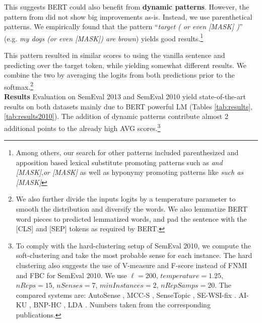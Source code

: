 \documentclass[11pt,a4paper]{article}
\begin{document}
This suggests BERT could also benefit from \textbf{dynamic patterns}. However,
the pattern from \citet{amrami2018word} did not show big improvements as-is. 
Instead, we use parenthetical
patterns. 
We empirically found that the pattern ``\emph{target ( or even [MASK] )}'' (e.g.
\emph{my dogs (or even [MASK]) are brown}) yields
good results.\footnote{Among others, our search for other patterns included parenthesized and apposition based lexical substitute promoting patterns such as \emph{and [MASK]},\emph{or [MASK]} as well as hyponymy promoting patterns like \emph{such as [MASK]}} 

This pattern resulted in similar scores to using the
vanilla sentence and predicting over the target token, while yielding somewhat
different results. We combine the two by averaging the logits from both
predictions prior to the softmax.\footnote{We also further divide the inputs
logits by a temperature parameter to smooth the distribution and diversify the
words. We also lemmatize BERT word pieces to predicted lemmatized words, and pad
the sentence with the [CLS] and [SEP] tokens as required by BERT.}
\\
\noindent\textbf{Results }
Evaluation on SemEval 2013 and SemEval 2010 yield 
state-of-the-art results on both datasets mainly due to BERT powerful LM (Tables \ref{tab:results},\ref{tab:results2010}). The addition of dynamic patterns contribute almost 2 additional points to the already
high AVG scores.\footnote{To comply with the hard-clustering setup of SemEval
2010, we compute the soft-clustering and take the most probable sense for each
instance. The hard clustering also suggests the use of V-measure and F-score
instead of FNMI and FBC for SemEval 2010. We use $\ell=200$, $temperature=1.25$,
$nReps=15$, $nSenses=7$, $minInstances=2$, $nRepSamps=20$. The compared systems
are: AutoSense \cite{hwang2019autosense}, 
MCC-S \cite{komninos2016structured}, 
SenseTopic \cite{wang2015sense}, 
SE-WSI-fix \cite{song2016word}.
AI-KU \cite{baskaya2013ai}
, BNP-HC \cite{teh2005sharing}
, LDA \cite{blei2003latent}. Numbers taken from the corresponding publications.}
\end{document}
